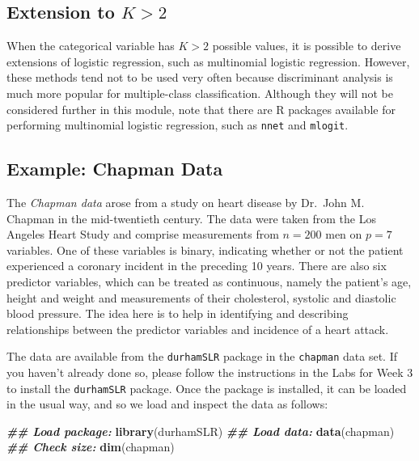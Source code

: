 \documentclass[
]{article}
\newenvironment{Shaded}{\begin{snugshade}}{\end{snugshade}}
\newcommand{\DocumentationTok}[1]{\textcolor[rgb]{0.56,0.35,0.01}{\textbf{\textit{#1}}}}
\newcommand{\FunctionTok}[1]{\textcolor[rgb]{0.13,0.29,0.53}{\textbf{#1}}}
\newcommand{\NormalTok}[1]{#1}
\begin{document}
\hypertarget{extension-to-k-2}{%
\subsection{\texorpdfstring{Extension to
\(K > 2\)}{Extension to K \textgreater{} 2}}\label{extension-to-k-2}}

When the categorical variable has \(K>2\) possible values, it is
possible to derive extensions of logistic regression, such as
multinomial logistic regression. However, these methods tend not to be
used very often because discriminant analysis is much more popular for
multiple-class classification. Although they will not be considered
further in this module, note that there are R packages available for
performing multinomial logistic regression, such as \texttt{nnet} and
\texttt{mlogit}.

\hypertarget{subsec:chapmandata}{%
\subsection{Example: Chapman Data}\label{subsec:chapmandata}}

The \emph{Chapman data} arose from a study on heart disease by Dr.~John
M. Chapman in the mid-twentieth century. The data were taken from the
Los Angeles Heart Study and comprise measurements from \(n=200\) men on
\(p=7\) variables. One of these variables is binary, indicating whether
or not the patient experienced a coronary incident in the preceding 10
years. There are also six predictor variables, which can be treated as
continuous, namely the patient's age, height and weight and measurements
of their cholesterol, systolic and diastolic blood pressure. The idea
here is to help in identifying and describing relationships between the
predictor variables and incidence of a heart attack.

The data are available from the \texttt{durhamSLR} package in the
\texttt{chapman} data set. If you haven't already done so, please follow
the instructions in the Labs for Week 3 to install the
\texttt{durhamSLR} package. Once the package is installed, it can be
loaded in the usual way, and so we load and inspect the data as follows:

\begin{Shaded}
\begin{Highlighting}[]
\DocumentationTok{\#\# Load package:}
\FunctionTok{library}\NormalTok{(durhamSLR)}
\DocumentationTok{\#\# Load data:}
\FunctionTok{data}\NormalTok{(chapman)}
\DocumentationTok{\#\# Check size:}
\FunctionTok{dim}\NormalTok{(chapman)}
\end{Highlighting}
\end{Shaded}
\end{document}
